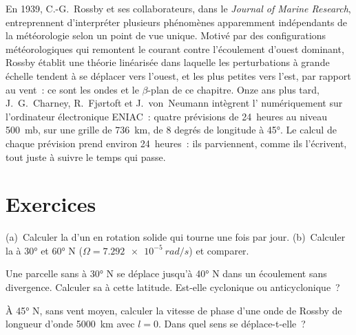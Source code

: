 \begin{history}
En 1939, C.-G.~Rossby et ses collaborateurs, dans le \emph{Journal of Marine
Research}, entreprennent d'interpréter plusieurs phénomènes apparemment indépendants
de la météorologie selon un point de vue unique. Motivé par des
configurations météorologiques qui remontent le courant contre l'écoulement d'ouest dominant, Rossby établit
une théorie linéarisée dans laquelle les perturbations à grande échelle tendent à se déplacer vers l'ouest,
et les plus petites vers l'est, par rapport au vent~: ce sont les ondes et le
$\beta$-plan de ce chapitre. Onze ans plus tard, J.~G.~Charney,
R.~Fjørtoft et J.~von~Neumann intègrent l'
numériquement sur l'ordinateur électronique ENIAC~: quatre prévisions de 24~heures au
niveau \qty{500}{mb}, sur une grille de \qty{736}{km}, de 8 degrés de longitude
à \ang{45}. Le calcul de chaque prévision prend environ 24~heures~: ils
parviennent, comme ils l'écrivent, tout juste à suivre le temps qui passe.
\end{history}

\section{Exercices}

\begin{exercise}[$\star$]\label{exo:b3:atmospheric-dynamics:1}
(a)~Calculer la  d'un  en rotation solide qui tourne
une fois par jour. (b)~Calculer la  à \ang{30} et \ang{60} N
($\Omega = \qty{7.292e-5}{rad/s}$) et comparer.
\end{exercise}

\begin{exercise}[$\star$]\label{exo:b3:atmospheric-dynamics:2}
Une parcelle sans  à \ang{30} N se déplace jusqu'à \ang{40} N dans
un écoulement sans divergence. Calculer sa  à cette latitude. Est-elle
cyclonique ou anticyclonique~?
\end{exercise}

\begin{exercise}[$\star$]\label{exo:b3:atmospheric-dynamics:3}
À \ang{45} N, sans vent moyen, calculer la vitesse de phase d'une onde de Rossby
de longueur d'onde \qty{5000}{km} avec $l = 0$. Dans quel sens se déplace-t-elle~?
\end{exercise}

